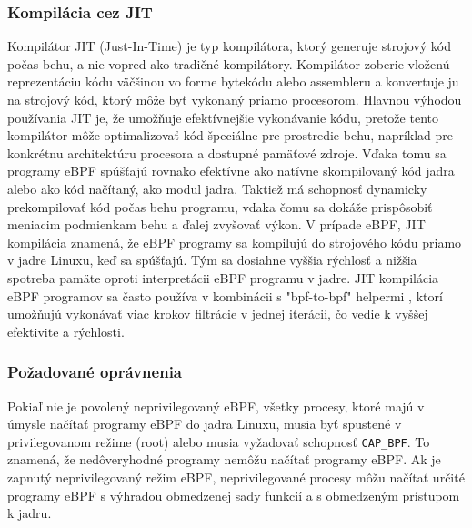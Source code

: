 \subsubsection{Kompilácia cez JIT}
Kompilátor JIT (Just-In-Time) je typ kompilátora, ktorý generuje strojový kód počas behu, a nie vopred ako tradičné kompilátory. 
Kompilátor zoberie vloženú reprezentáciu kódu  väčšinou vo forme bytekódu alebo assembleru a konvertuje ju na strojový kód, ktorý môže byť vykonaný priamo procesorom. 
Hlavnou výhodou používania JIT je, že umožňuje efektívnejšie vykonávanie kódu, pretože tento kompilátor môže optimalizovať kód špeciálne pre prostredie behu, 
napríklad pre konkrétnu architektúru procesora a dostupné pamäťové zdroje. Vďaka tomu sa programy eBPF spúšťajú rovnako efektívne ako natívne skompilovaný 
kód jadra alebo ako kód načítaný, ako modul jadra. Taktiež má  schopnosť dynamicky prekompilovať kód počas behu programu, vďaka čomu sa dokáže prispôsobiť 
meniacim podmienkam behu a ďalej zvyšovať výkon. V prípade eBPF, JIT kompilácia znamená, že eBPF programy sa kompilujú do strojového kódu priamo v jadre Linuxu, 
keď sa spúšťajú. Tým sa dosiahne vyššia rýchlosť a nižšia spotreba pamäte oproti interpretácii eBPF programu v jadre. JIT kompilácia eBPF programov sa 
často používa v kombinácii s "bpf-to-bpf" helpermi , ktorí umožňujú vykonávať viac krokov filtrácie v jednej iterácii, čo vedie k vyššej efektivite a rýchlosti.

\subsubsection*{Požadované oprávnenia}
Pokiaľ nie je povolený neprivilegovaný eBPF, všetky procesy, ktoré majú v úmysle načítať programy eBPF do jadra Linuxu, 
musia byť spustené v privilegovanom režime (root) alebo musia vyžadovať schopnosť \texttt{CAP\_BPF}. To znamená, 
že nedôveryhodné programy nemôžu načítať programy eBPF. Ak je zapnutý neprivilegovaný režim eBPF, neprivilegované 
procesy môžu načítať určité programy eBPF s výhradou obmedzenej sady funkcií a s obmedzeným prístupom k jadru.

